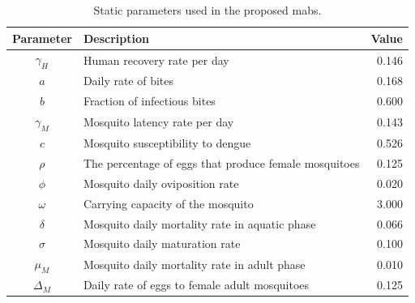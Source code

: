 \begin{table}[!ht]
	\centering
	\caption{\label{tab:parameters-mabs} Static parameters used in the proposed
		\gls{mabs}.} \small{%
		\begin{tabular}{c|l|r}
			\toprule
			\textbf{Parameter} & \textbf{Description}                                  & \textbf{Value} \\ \midrule
			$\gamma_H$         & Human recovery rate per day                           & 0.146          \\ \hline
			$a$                & Daily rate of bites                                   & 0.168          \\ \hline
			$b$                & Fraction of infectious bites                          & 0.600          \\ \hline
			$\gamma_M$         & Mosquito latency rate per day                         & 0.143          \\ \hline
			$c$                & Mosquito susceptibility to dengue                     & 0.526          \\ \hline
			$\rho$             & The percentage of eggs that produce female mosquitoes & 0.125
			\\ \hline
			$\phi$             & Mosquito daily oviposition rate                       & 0.020          \\ \hline
			$\omega$           & Carrying capacity of the mosquito                     & 3.000          \\
			\hline
			$\delta$           & Mosquito daily mortality rate in aquatic phase        & 0.066          \\ \hline
			$\sigma$           & Mosquito daily maturation rate                        & 0.100          \\ \hline
			$\mu_M$            & Mosquito daily mortality rate in adult phase          & 0.010
			\\ \hline
			$\Delta_M$         & Daily rate of eggs to female adult mosquitoes         &
			0.125                                                                                       \\
			\bottomrule
		\end{tabular}%
	}
\end{table}

